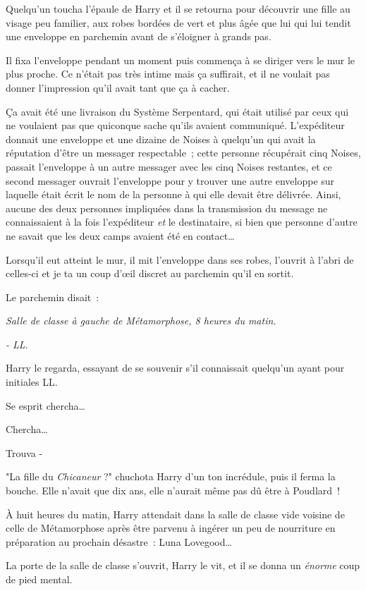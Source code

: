 Quelqu'un toucha l'épaule de Harry et il se retourna pour découvrir une fille au visage peu familier, aux robes bordées de vert et plus âgée que lui qui lui tendit une enveloppe en parchemin avant de s'éloigner à grands pas.

Il fixa l'enveloppe pendant un moment puis commença à se diriger vers le mur le plus proche. Ce n'était pas très intime mais ça suffirait, et il ne voulait pas donner l'impression qu'il avait tant que ça à cacher.

Ça avait été une livraison du Système Serpentard, qui était utilisé par ceux qui ne voulaient pas que quiconque sache qu'ils avaient communiqué. L'expéditeur donnait une enveloppe et une dizaine de Noises à quelqu'un qui avait la réputation d'être un messager respectable~; cette personne récupérait cinq Noises, passait l'enveloppe à un autre messager avec les cinq Noises restantes, et ce second messager ouvrait l'enveloppe pour y trouver une autre enveloppe sur laquelle était écrit le nom de la personne à qui elle devait être délivrée. Ainsi, aucune des deux personnes impliquées dans la transmission du message ne connaissaient à la fois l'expéditeur \emph{et} le destinataire, si bien que personne d'autre ne savait que les deux camps avaient été en contact…

Lorsqu'il eut atteint le mur, il mit l'enveloppe dans ses robes, l'ouvrit à l'abri de celles-ci et je ta un coup d'œil discret au parchemin qu'il en sortit.

Le parchemin disait~:

\emph{Salle de classe à gauche de Métamorphose, 8 heures du matin.}

\emph{- LL.}

Harry le regarda, essayant de se souvenir s'il connaissait quelqu'un ayant pour initiales LL.

Se esprit chercha…

Chercha…

Trouva -

"La fille du \emph{Chicaneur} ?" chuchota Harry d'un ton incrédule, puis il ferma la bouche. Elle n'avait que dix ans, elle n'aurait même pas dû être à Poudlard~!


À huit heures du matin, Harry attendait dans la salle de classe vide voisine de celle de Métamorphose après être parvenu à ingérer un peu de nourriture en préparation au prochain désastre~: Luna Lovegood…

La porte de la salle de classe s'ouvrit, Harry le vit, et il se donna un \emph{énorme} coup de pied mental.

